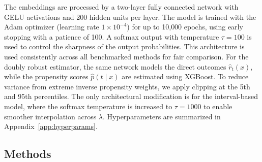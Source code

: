 \documentclass{article}
\theoremstyle{remark}
\begin{document}
The embeddings are processed by a two-layer fully connected network with GELU activations and 200 hidden units per layer. The model is trained with the Adam optimizer (learning rate \(1 \times 10^{-4}\)) for up to 10{,}000 epochs, using early stopping with a patience of 100. A softmax output with temperature \(\tau = 100\) is used to control the sharpness of the output probabilities. This architecture is used consistently across all benchmarked methods for fair comparison. For the doubly robust estimator, the same network models the direct outcomes \(\hat{r}_t(x)\), while the propensity scores \(\hat{p}(t \mid x)\) are estimated using XGBoost. To reduce variance from extreme inverse propensity weights, we apply clipping at the 5th and 95th percentiles. The only architectural modification is for the interval-based model, where the softmax temperature is increased to \(\tau = 1000\) to enable smoother interpolation across \(\lambda\). Hyperparameters are summarized in Appendix~\ref{app:hyperparams}.








\subsection{Methods}



\end{document}

